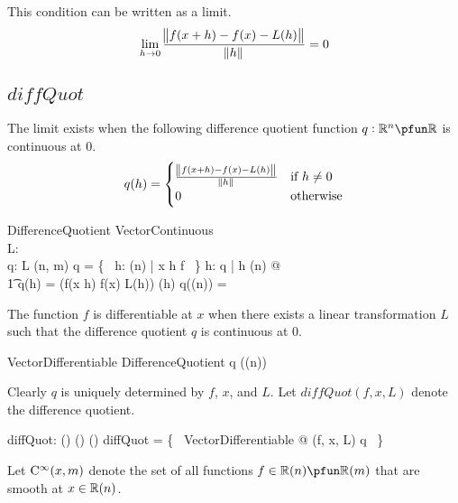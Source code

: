 \documentclass[11pt, oneside]{article}
\begin{document}
This condition can be written as a limit.
$$
\lim_{h \to 0} \frac{\norm{f(x+h) - f(x) - L(h)}}{\norm{h}} = 0
$$

\subsection{$diffQuot$}

The limit exists when the following difference quotient function $q: \R^n \pfun \R$ is continuous at $0$.
$$
q(h) = 
\begin{cases}
	\frac{\norm{f(x+h) - f(x) - L(h)}}{\norm{h}}	&	\text{if } h \neq 0\\
	0								&	\text{otherwise}
\end{cases}
$$

\begin{schema}{DifferenceQuotient}
	VectorContinuous \\
	L: \Rinf \pfun \Rinf \\
	q: \Rinf \pfun \R
\where
	L \in \linR(n, m)
\also
	\dom q = \{~ h: \Rtuples(n) | x \vaddR h \in \dom f ~\}
\also
	\forall h: \dom q | h \neq \zeroRn(n) @ \\
	\t1	q(h) = \normR(f(x \vaddR h) \vsubR f(x) \vsubR L(h)) \divR \normR(h)
\also
	q(\zeroRn(n)) = \zeroR
\end{schema}

The function $f$ is differentiable at $x$ when there exists a linear transformation $L$ such that the difference quotient $q$ is
continuous at $0$.

\begin{schema}{VectorDifferentiable}
	DifferenceQuotient
\where
	q \in \CzeroRn(\zeroRn(n))
\end{schema}

Clearly $q$ is uniquely determined by $f$, $x$, and $L$.
Let $diffQuot(f,x,L)$ denote the difference quotient.

\begin{axdef}
	diffQuot: (\Rinf \pfun \Rinf) \cross \Rinf \cross (\Rinf \pfun \Rinf) \pfun (\Rinf \pfun \R)
\where
	diffQuot = \{~ VectorDifferentiable @ (f, x, L) \mapsto q ~\}
\end{axdef}




Let $\operatorname{C^\infty}(x,m)$ denote the set of all functions $f \in \Rtuples(n) \pfun \Rtuples(m)$ that are smooth at $x \in \mathbb{R}(n)$.

\printbibliography
\end{document}
